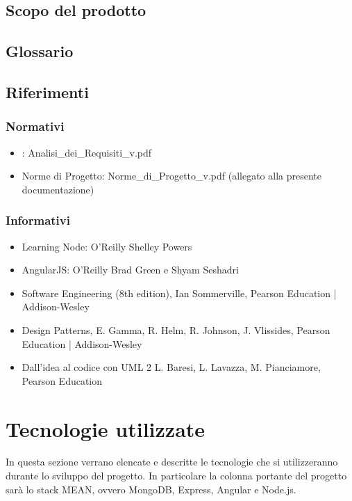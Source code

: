 \subsection{Scopo del prodotto}
\Prodotto{}

\subsection{Glossario}
\Glossario{}

\subsection{Riferimenti}

\subsubsection{Normativi}
\begin{itemize}
\item {}: Analisi\_{}dei\_{}Requisiti\_{}v\versioneNormeDiProgetto{}.pdf
\item Norme di Progetto: Norme\_{}di\_{}Progetto\_{}v\versioneNormeDiProgetto{}.pdf  (allegato alla presente documentazione)\\
\end{itemize}

\subsubsection{Informativi}
\begin{itemize}
\item Learning Node: O'Reilly Shelley Powers
\item AngularJS: O'Reilly Brad Green e Shyam Seshadri
\item Software Engineering (8th edition), Ian Sommerville, Pearson Education | Addison-Wesley
\item Design Patterns, E. Gamma, R. Helm, R. Johnson, J. Vlissides, Pearson Education | Addison-Wesley
\item Dall'idea al codice con UML 2       L. Baresi, L. Lavazza, M. Pianciamore, Pearson Education
\end{itemize}

\newpage
\section{Tecnologie utilizzate}
In questa sezione verrano elencate e descritte le tecnologie che si utilizzeranno durante lo sviluppo del progetto. In particolare la colonna portante del progetto sar\`{a} lo stack MEAN, ovvero MongoDB, Express, Angular e Node.js.

